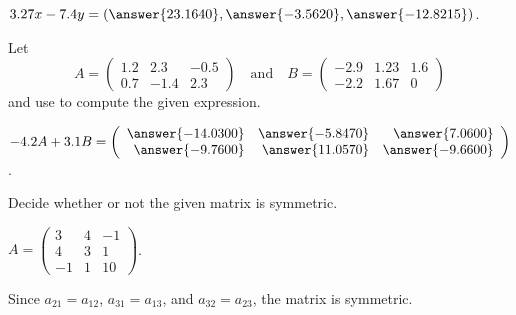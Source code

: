 \documentclass{ximera}
\begin{document}
\begin{computerExercise}  \label{c1.2.3a}
$3.27x-7.4y = \left(\answer{23.1640}, \answer{-3.5620}, \answer{-12.8215}\right)$.

\end{computerExercise}





\matlabproblemlabel

\noindent Let  \[ A = \left(\begin{array}{rrr} 1.2 & 2.3 & -0.5\\ 0.7 & -1.4 & 2.3 \end{array}\right) \quad\mbox{and}\quad B = \left(\begin{array}{rrr} -2.9 & 1.23 & 1.6\\ -2.2 & 1.67 & 0 \end{array}\right) \] and use \Matlab to compute the given expression.

\begin{computerExercise}  \label{c1.2.4a}
$-4.2A+3.1B = \left(\begin{array}{rrr} 
\answer{-14.0300} & \answer{-5.8470} &    \answer{7.0600} \\
 \answer{-9.7600} & \answer{11.0570} &   \answer{-9.6600}\end{array}\right)$.

\end{computerExercise}





\problemlabel

\noindent Decide whether or not the given matrix is symmetric.

\begin{exercise} \label{c1.1.01e}
 $A = \left( \begin{array}{rrr}
 3 & 4 & -1\\
 4 & 3 &  1\\
 -1 & 1 & 10\end{array} \right)$.
  \begin{multipleChoice}
  \end{multipleChoice}
       

\begin{feedback}[correct]
Since $a_{21} = a_{12}$, $a_{31} = a_{13}$, and $a_{32} = a_{23}$, the matrix is symmetric.

\end{feedback}
\end{exercise}
\end{document}

